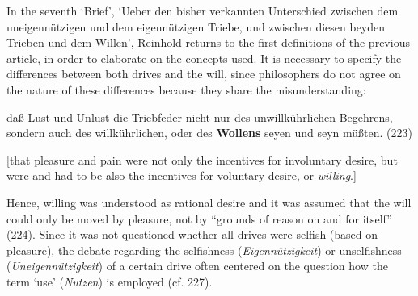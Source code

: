  In the seventh `Brief', `Ueber den bisher verkannten Unterschied zwischen dem uneigenn\"{u}tzigen und dem eigenn\"{u}tzigen Triebe, und zwischen diesen beyden Trieben und dem Willen', Reinhold returns to the first definitions of the previous article, in order to elaborate on the concepts used. It is necessary to specify the differences between both drives and the will, since philosophers do not agree on the nature of these differences because they share the misunderstanding: 

da\ss{} Lust und Unlust die Triebfeder nicht nur des unwillk\"{u}hrlichen Begehrens, sondern auch des willk\"{u}hrlichen, oder des \textbf{Wollens} seyen und seyn m\"{u}\ss{}ten. (223)

[that pleasure and pain were not only the incentives for involuntary desire, but were and had to be also the incentives for voluntary desire, or \textit{willing}.]

Hence, willing was understood as rational desire and it was assumed that the will could only be moved by pleasure, not by ``grounds of reason on and for itself'' (224). Since it was not questioned whether all drives were selfish (based on pleasure), the debate regarding the selfishness (\textit{Eigenn\"{u}tzigkeit}) or unselfishness (\textit{Uneigenn\"{u}tzigkeit}) of a certain drive often centered on the question how the term `use' (\textit{Nutzen}) is employed (cf. 227). 

